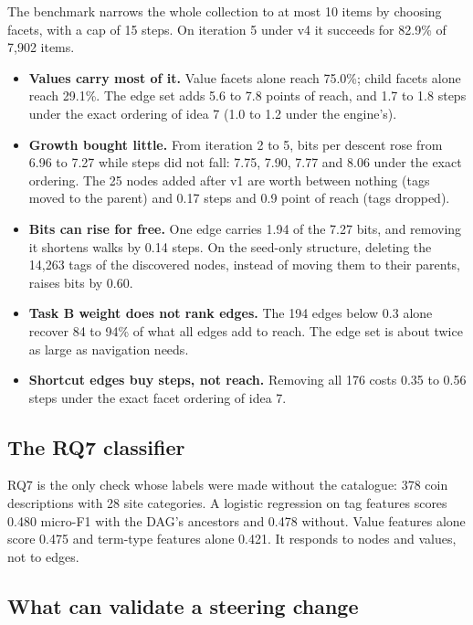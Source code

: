 \documentclass[10pt,a4paper]{article}
\begin{document}
The benchmark narrows the whole collection to at most 10 items by choosing facets, with a cap of 15 steps.
On iteration 5 under v4 it succeeds for 82.9\% of 7,902 items.
\begin{itemize}
\item \textbf{Values carry most of it.} Value facets alone reach 75.0\%; child facets alone reach 29.1\%. The edge set adds 5.6 to 7.8 points of reach, and 1.7 to 1.8 steps under the exact ordering of idea 7 (1.0 to 1.2 under the engine's).
\item \textbf{Growth bought little.} From iteration 2 to 5, bits per descent rose from 6.96 to 7.27 while steps did not fall: 7.75, 7.90, 7.77 and 8.06 under the exact ordering. The 25 nodes added after v1 are worth between nothing (tags moved to the parent) and 0.17 steps and 0.9 point of reach (tags dropped).
\item \textbf{Bits can rise for free.} One edge carries 1.94 of the 7.27 bits, and removing it shortens walks by 0.14 steps. On the seed-only structure, deleting the 14,263 tags of the discovered nodes, instead of moving them to their parents, raises bits by 0.60.
\item \textbf{Task B weight does not rank edges.} The 194 edges below 0.3 alone recover 84 to 94\% of what all edges add to reach. The edge set is about twice as large as navigation needs.
\item \textbf{Shortcut edges buy steps, not reach.} Removing all 176 costs 0.35 to 0.56 steps under the exact facet ordering of idea 7.
\end{itemize}

\subsection{The RQ7 classifier}

RQ7 is the only check whose labels were made without the catalogue: 378 coin descriptions with 28 site
categories. A logistic regression on tag features scores 0.480 micro-F1 with the DAG's ancestors and 0.478
without. Value features alone score 0.475 and term-type features alone 0.421. It responds to nodes and
values, not to edges.

\subsection{What can validate a steering change}
\end{document}
